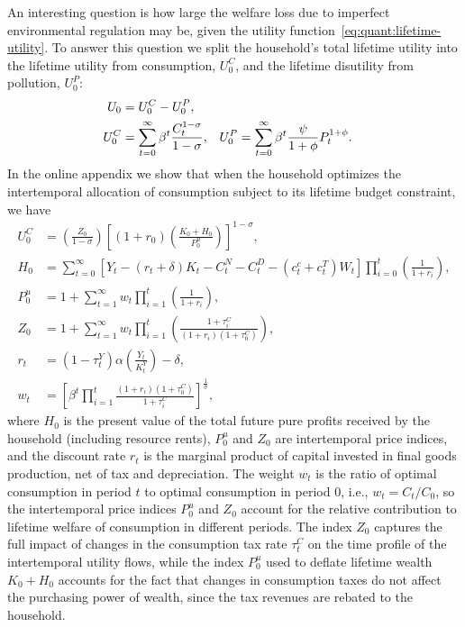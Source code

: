 An interesting question is how large the welfare loss due to imperfect environmental regulation may be, given the utility function~\eqref{eq:quant:lifetime-utility}. To answer this question we split the household's total lifetime utility into the lifetime utility from consumption, $U_0^C$, and the lifetime disutility from pollution, $U_0^P$:
\begin{align}
U_0 &= U_0^C - U_0^P,
\label{eq:quant:welfare-split}
\\
U_0^C &= \sum_{t=0}^{\infty} \beta^t \frac{C_t^{1-\sigma}}{1-\sigma},
&
U_0^P &= \sum_{t=0}^{\infty} \beta^t \frac{\psi}{1+\phi}P_t^{1+\phi}.
\notag
\end{align}
In the online appendix we show that when the household optimizes the intertemporal allocation of consumption subject to its lifetime budget constraint, we have
\begin{align}
U_0^C &= \left(\frac{Z_0}{1-\sigma}\right)\left[(1+r_0)\left(\frac{K_0+H_0}{P_0^u}\right)\right]^{1-\sigma},
\label{eq:quant:consumption-utility}
\\
H_0 &= \sum_{t=0}^{\infty} \left[Y_t - (r_t+\delta)K_t - C_t^N - C_t^D - \left(c_t^c+c_t^T\right)W_t\right]\prod_{i=0}^{t}\left(\frac{1}{1+r_i}\right),
\label{eq:quant:profit-wealth}
\\
P_0^u &= 1 + \sum_{t=1}^{\infty} w_t\prod_{i=1}^{t}\left(\frac{1}{1+r_i}\right), \label{eq:quant:price-index}
\\ 
Z_0 &= 1 + \sum_{t=1}^{\infty} w_t\prod_{i=1}^{t}\left(\frac{1+\tau_i^C}{(1+r_i)(1+\tau_0^C)}\right),
\label{eq:quant:tax-index}
\\
r_t &= (1-\tau_t^Y)\alpha\left(\frac{Y_t}{K_t^Y}\right) - \delta, \label{eq:quant:rate-of-return}
\\
w_t &= \left[\beta^t\prod_{i=1}^{t}\frac{(1+r_i)(1+\tau_0^C)}{1+\tau_i^C}\right]^{\frac{1}{\sigma}},
\label{eq:quant:interest-weight}
\end{align}
where $H_0$ is the present value of the total future pure profits received by the household (including resource rents), $P_0^u$ and $Z_0$ are intertemporal price indices, and the discount rate $r_t$ is the marginal product of capital invested in final goods production, net of tax and depreciation. The weight $w_t$ is the ratio of optimal consumption in period $t$ to optimal consumption in period $0$, i.e., $w_t = C_t/C_0$, so the intertemporal price indices $P_0^u$ and $Z_0$ account for the relative contribution to lifetime welfare of consumption in different periods. The index $Z_0$ captures the full impact of changes in the consumption tax rate $\tau_t^C$ on the time profile of the intertemporal utility flows, while the index $P_0^u$ used to deflate lifetime wealth $K_0+H_0$ accounts for the fact that changes in consumption taxes do not affect the purchasing power of wealth, since the tax revenues are rebated to the household.

